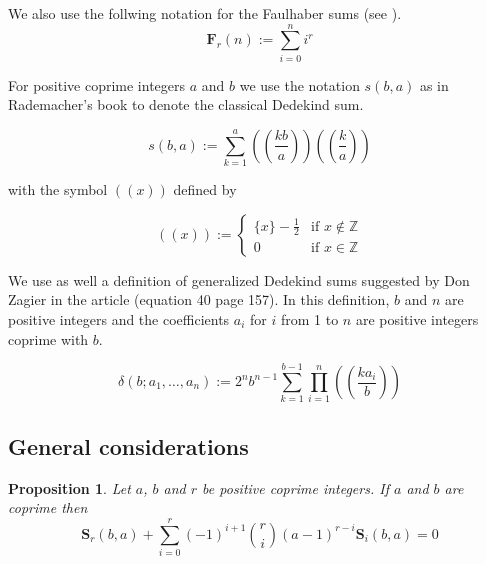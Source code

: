 \documentclass{article}%
\newtheorem{proposition}[theorem]{Proposition}
\newcommand{\SUMS}[3]{\mathbf{S}_{#1}\left(#2,#3\right)}
\newcommand{\SUMF}[2]{\mathbf{F}_{#1}\left(#2\right)}
\newcommand{\doublepariii}[1]{\left(\!\!\!\left(#1\right)\!\!\!\right)}
\newcommand{\doublepari}[1]{\left(\!\left(#1\right)\!\right)}
\begin{document}
We also use the follwing notation for the Faulhaber sums (see \cite{schumacher2016extended}).
\begin{equation}
\SUMF{r}{n}:=\sum_{i=0}^n i^r
\label{eq:def_Frn}
\end{equation}

For positive coprime integers $a$ and $b$ we use the notation $s(b,a)$ as in Rademacher's book \cite{rademacher1972dedekind} to denote the classical Dedekind sum.

\begin{equation}
s(b,a):=\sum_{k=1}^a \doublepariii{\frac{kb}{a}}\doublepariii{\frac{k}{a}}
\label{eq:def_Dedekind_sum}
\end{equation}

with the symbol $\doublepari{x}$ defined by

\begin{equation}
\doublepari{x} := \left\{
    \begin{array}{ll}
        \{x\}-\frac{1}{2} & \mbox{if  } x\notin\mathbb{Z} \\
				0                 & \mbox{if  } x\in\mathbb{Z}
    \end{array}
\right.
\end{equation}

We use as well a definition of generalized Dedekind sums suggested  by Don Zagier in the article \cite{zagier1973higher} (equation 40 page 157). In this definition, $b$ and $n$ are positive integers and the coefficients $a_i$ for $i$ from 1 to $n$ are positive integers coprime with $b$.

\begin{equation}
\delta(b;a_1,\ldots ,a_n) := 2^nb^{n-1}\sum_{k=1}^{b-1}\prod_{i=1}^n \doublepariii{\frac{ka_i}{b}}
\label{eq:def_generalized_Dedekind_sum}
\end{equation}

\subsection{General considerations}\label{sec:General_considerations}

\begin{proposition}\label{prop:rel_Srba_Siba} Let $a$, $b$ and $r$ be positive coprime integers. If $a$ and $b$ are coprime then
\begin{equation}
\SUMS{r}{b}{a}+\sum_{i=0}^r(-1)^{i+1}\binom{r}{i}(a-1)^{r-i}\SUMS{i}{b}{a}=0
\label{eq:rel_Srba_Siba}
\end{equation} 
\end{proposition}
\end{document}
